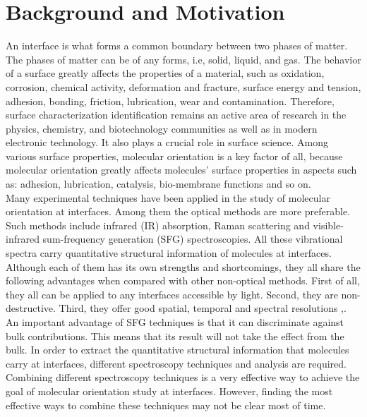  \label{ch:1}
\section{Background and Motivation}
An interface is what forms a common boundary between two phases of matter. The phases of matter can be of any forms, i.e, solid, liquid, and gas. The behavior of a surface greatly affects the properties of a material, such as oxidation, corrosion, chemical activity, deformation and fracture, surface energy and tension, adhesion, bonding, friction, lubrication, wear and contamination. Therefore, surface characterization identification remains an active area of research in the physics, chemistry, and biotechnology communities as well as in modern electronic technology. It also plays a crucial role in surface science. Among various surface properties, molecular orientation is a key factor of all, because molecular orientation greatly affects molecules' surface properties in aspects such as: adhesion, lubrication, catalysis, bio-membrane functions and so on. \cite{PhysRevB.59.12632}\\

Many experimental techniques have been applied in the study of molecular orientation at interfaces. Among them the optical methods are more preferable. Such methods include infrared (IR) absorption, Raman scattering and visible-infrared sum-frequency generation (SFG) spectroscopies. All these vibrational spectra carry quantitative structural information of molecules at interfaces. Although each of them has its own strengths and shortcomings, they all share the following advantages when compared with other non-optical methods. First of all, they all can be applied to any interfaces accessible by light. Second, they are non-destructive. Third, they offer good spatial, temporal and spectral resolutions \cite{Brasselet:11},\cite{PhysRevB.59.12632}. An important advantage of SFG techniques is that it can discriminate against bulk contributions. This means that its result will not take the effect from the bulk. In order to extract the quantitative structural information that molecules carry at interfaces, different spectroscopy techniques and analysis are required. Combining different spectroscopy techniques is a very effective way to achieve the goal of molecular orientation study at interfaces. However, finding the most effective ways to combine these techniques may not be clear most of time.\\

